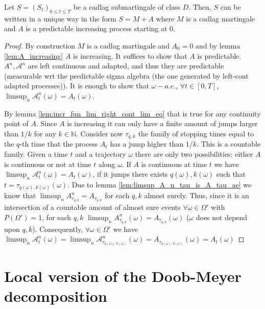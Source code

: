 \begin{theorem}\label{thm:Doob_Meyer}
  Let $S = (S_t )_{0\leq t\leq T}$ be a cadlag submartingale of class $D$.
  Then, $S$ can be written in a unique way in the form  $S = M + A$ where $M$ is a cadlag martingale and $A$ is a predictable increasing process starting at $0$.
\end{theorem}
\begin{proof}
  By construction $M$ is a cadlag martingale and $A_0=0$ and by lemma \ref{lem:A_increasing} $A$ is increasing. It suffices to show that $A$ is predictable.
  $A^n,\mathcal{A}^n$ are left continuous and adapted, and thus they are predictable (measurable wrt the predictable sigma algebra (the one generated by left-cont adapted processes)).
  It is enough to show that $\omega-a.e.$, $\forall t\in[0,T]$, $\limsup_n\mathcal{A}^n_t(\omega)=A_t(\omega)$.

  By lemma \ref{lem:incr_fun_lim_right_cont_lim_eq} that is true for any continuity point of $A$. Since $A$ is increasing it can only have a finite amount of jumps larger than $1/k$ for any $k\in\mathbb{N}$.
  Consider now $\tau_{q,k}$ the family of stopping times equal to the $q$-th time that the process $A_t$ has a jump higher than $1/k$. This is a countable family.
  Given a time $t$ and a trajectory $\omega$ there are only two possibilities: either $A$ is continuous or not at time $t$ along $\omega$.
  If $A$ is continuous at time $t$ we have $\limsup_n\mathcal{A}^n_t(\omega)=A_t(\omega)$, if it jumps there exists $q(\omega),k(\omega)$ such that $t=\tau_{q(\omega),k(\omega)}(\omega)$.
  Due to lemma \ref{lem:limsup_A_n_tau_is_A_tau_ae} we know that $\limsup_n A^n_{\tau_{q,k}} = A_{\tau_{q,k}}$ for each $q,k$ almost surely. Thus, since it is an intersection of a countable amount of almost sure
  events $\forall\omega\in\Omega'$ with $P(\Omega')=1$, for each $q,k$ $\limsup_n A^n_{\tau_{q,k}}(\omega) = A_{\tau_{q,k}}(\omega)$ ($\omega$ does not depend upon $q,k$).
  Consequently, $\forall\omega\in\Omega'$ we have $\limsup_n\mathcal{A}^n_t(\omega)=\limsup_n\mathcal{A}^n_{\tau_{q(\omega),k(\omega)}}(\omega)=A_{\tau_{q(\omega),k(\omega)}}(\omega)=A_t(\omega)$
\end{proof}



\section{Local version of the Doob-Meyer decomposition}



